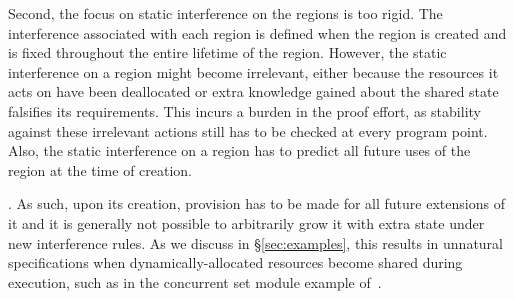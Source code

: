 Second, the focus on static interference on the regions is too rigid. 
The interference associated with each region is defined when
the region  is created and is fixed throughout the entire lifetime of
the region. However, the static interference  on a region might 
become irrelevant, either because the resources it acts on have been
deallocated or extra knowledge gained about the shared state
falsifies its requirements.  This incurs
a burden in the proof effort, as stability against these irrelevant
actions still has to be checked at every program point.
Also, the static interference on  a region has to predict all future 
uses of the region at the time of creation. 


. As such, upon its creation, provision
has to be made for all future extensions of it and it is generally not
possible to arbitrarily grow it with extra state under new
interference rules.  As we discuss in \S\ref{sec:examples}, this
results in unnatural specifications when dynamically-allocated
resources become shared during execution, such as in the concurrent
set module example of~\cite{cap-ecoop10}.





